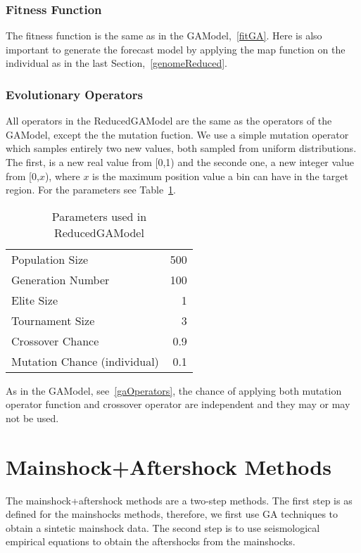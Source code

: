 \subsubsection{Fitness Function}
The fitness function is the same as in the GAModel,~\ref{fitGA}. Here is also important to generate the forecast model by applying the map function on the individual as in the last Section,~\ref{genomeReduced}.\\

\subsubsection{Evolutionary Operators}\label{ReducedOperators}
All operators in the ReducedGAModel are the same as the operators of the GAModel, except the the mutation fuction. We use a simple mutation operator which samples entirely two new values, both sampled from uniform distributions. The first, is a new real value from [0,1) and the seconde one, a new integer value from [0,$x$), where $x$ is the maximum position value a bin can have in the target region. For the parameters see Table~\ref{GAHParameters}.

\begin{table}[!ht]
  \caption{Parameters used in ReducedGAModel}
  \label{GAHParameters}
  \begin{center}
  \begin{tabular}{|l|r|}
    \hline
    Population Size & 500\\
    Generation Number & 100\\
    Elite Size & 1\\
    Tournament Size & 3\\
    Crossover Chance & 0.9\\
    Mutation Chance (individual) & 0.1\\
    \hline    
  \end{tabular}
  \end{center}
\end{table}

As in the GAModel, see~\ref{gaOperators}, the chance of applying both mutation operator function and crossover operator are independent and they may or may not be used.\\

\section{Mainshock+Aftershock Methods}\label{m+a+e}
The mainshock+aftershock methods are a two-step methods. The first step is as defined for the mainshocks methods, therefore, we first use GA techniques to obtain a sintetic mainshock data. The second step is to use seismological empirical equations to obtain the aftershocks from the mainshocks.\\


